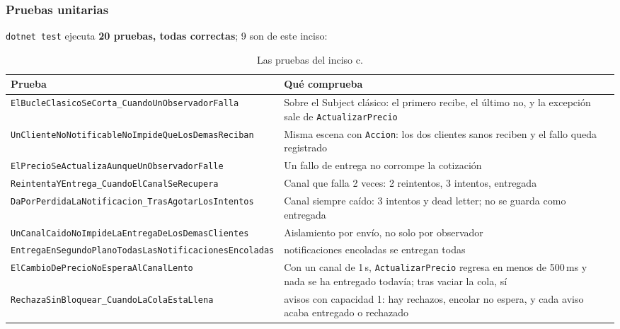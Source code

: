 \subsubsection{Pruebas unitarias}

\texttt{dotnet test} ejecuta \textbf{20 pruebas, todas correctas}; 9 son de este inciso:

\begin{table}[H]
\centering
\small
\begin{tabularx}{\textwidth}{>{\raggedright\arraybackslash}p{6.1cm} >{\raggedright\arraybackslash}X}
\toprule
\textbf{Prueba} & \textbf{Qué comprueba} \\
\midrule
\texttt{ElBucleClasicoSeCorta\_Cuando\-UnObservadorFalla} & Sobre el Subject clásico: el primero recibe, el último no, y la excepción sale de \texttt{ActualizarPrecio} \\
\texttt{UnClienteNoNotificableNoImpide\-QueLosDemasReciban} & Misma escena con \texttt{Accion}: los dos clientes sanos reciben y el fallo queda registrado \\
\texttt{ElPrecioSeActualizaAunque\-UnObservadorFalle} & Un fallo de entrega no corrompe la cotización \\
\texttt{ReintentaYEntrega\_Cuando\-ElCanalSeRecupera} & Canal que falla 2 veces: 2 reintentos, 3 intentos, entregada \\
\texttt{DaPorPerdidaLaNotificacion\_\-TrasAgotarLosIntentos} & Canal siempre caído: 3 intentos y dead letter; no se guarda como entregada \\
\texttt{UnCanalCaidoNoImpideLa\-EntregaDeLosDemasClientes} & Aislamiento por envío, no solo por observador \\
\texttt{EntregaEnSegundoPlanoTodasLas\-NotificacionesEncoladas} & 50 notificaciones encoladas se entregan todas \\
\texttt{ElCambioDePrecioNoEspera\-AlCanalLento} & Con un canal de 1\,s, \texttt{ActualizarPrecio} regresa en menos de 500\,ms y nada se ha entregado todavía; tras vaciar la cola, sí \\
\texttt{RechazaSinBloquear\_Cuando\-LaColaEstaLlena} & 100 avisos con capacidad 1: hay rechazos, encolar no espera, y cada aviso acaba entregado o rechazado \\
\bottomrule
\end{tabularx}
\caption{Las pruebas del inciso c.}
\end{table}
